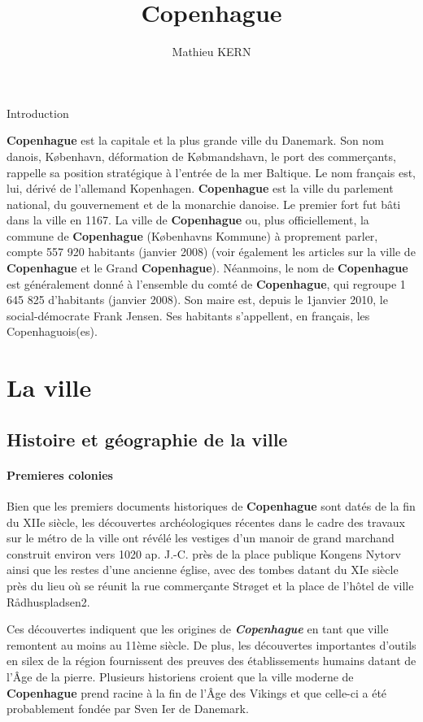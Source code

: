 \documentclass[a4paper,10pt,openany]{memoir}
\title{\textbf{Copenhague}}
\author{Mathieu KERN}
\begin{document}
\maketitle

Introduction

\textbf{Copenhague} est la capitale et la plus grande ville du Danemark. Son nom danois, København,
déformation de Købmandshavn, le port des commerçants, rappelle sa position stratégique à l'entrée de la 
mer Baltique. Le nom français est, lui, dérivé de l'allemand Kopenhagen.
\textbf{Copenhague} est la ville du parlement national, du gouvernement et de la monarchie danoise.
Le premier fort fut bâti dans la ville en 1167. La ville de \textbf{Copenhague} ou, 
plus officiellement, la commune de \textbf{Copenhague} (Københavns Kommune) à proprement parler, 
compte 557 920 habitants (janvier 2008) (voir également les articles sur la ville de \textbf{Copenhague} 
et le Grand \textbf{Copenhague}). Néanmoins, le nom de \textbf{Copenhague} est généralement donné à l'ensemble du 
comté de \textbf{Copenhague}, qui regroupe 1 645 825 d'habitants (janvier 2008).
Son maire est, depuis le 1\ier janvier 2010, le social-démocrate Frank Jensen.
Ses habitants s'appellent, en français, les Copenhaguois(es).
\pagebreak

\tableofcontents

\part{La ville}

\chapter{Histoire et géographie de la ville}

\subsection*{Premieres colonies}
Bien que les premiers documents historiques de \textbf{Copenhague} sont datés de la fin du XIIe siècle,
les découvertes archéologiques récentes dans le cadre des travaux sur le métro de la ville ont révélé
les vestiges d'un manoir de grand marchand construit environ vers 1020 ap. J.-C. près de la place 
publique Kongens Nytorv ainsi que les restes d'une ancienne église, avec des tombes datant du XIe 
siècle près du lieu où se réunit la rue commerçante Strøget et la place de l'hôtel de ville Rådhuspladsen2.

Ces découvertes indiquent que les origines de \emph{\textbf{Copenhague}} en tant que ville remontent au moins au 
11ème siècle. De plus, les découvertes importantes d'outils en silex de la région fournissent des 
preuves des établissements humains datant de l'Âge de la pierre. Plusieurs historiens croient que 
la ville moderne de \textbf{Copenhague} prend racine à la fin de l'Âge des Vikings et que celle-ci a été probablement
fondée par Sven Ier de Danemark.
\end{document}
